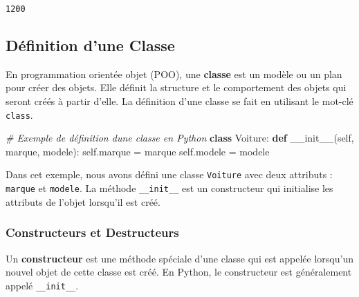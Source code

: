 \documentclass[11pt]{article}
\makeatletter
\newenvironment{Shaded}{}{}
\newcommand{\KeywordTok}[1]{\textcolor[rgb]{0.00,0.44,0.13}{\textbf{{#1}}}}
\newcommand{\CommentTok}[1]{\textcolor[rgb]{0.38,0.63,0.69}{\textit{{#1}}}}
\newcommand{\FunctionTok}[1]{\textcolor[rgb]{0.02,0.16,0.49}{{#1}}}
\newcommand{\NormalTok}[1]{{#1}}
\newcommand{\VariableTok}[1]{\textcolor[rgb]{0.10,0.09,0.49}{{#1}}}
\newcommand{\OperatorTok}[1]{\textcolor[rgb]{0.40,0.40,0.40}{{#1}}}
\newcommand{\boxspacing}{\kern\kvtcb@left@rule\kern\kvtcb@boxsep}
\newcommand{\prompt}[4]{
        {\ttfamily\llap{{\color{#2}[#3]:\hspace{3pt}#4}}\vspace{-\baselineskip}}
    }
\makeatother
\begin{document}
            \begin{tcolorbox}[breakable, size=fbox, boxrule=.5pt, pad at break*=1mm, opacityfill=0]
\prompt{Out}{outcolor}{8}{\boxspacing}
\begin{Verbatim}[commandchars=\\\{\}]
1200
\end{Verbatim}
\end{tcolorbox}
        
    \hypertarget{duxe9finition-dune-classe}{%
\subsection{Définition d'une Classe}\label{duxe9finition-dune-classe}}

En programmation orientée objet (POO), une \textbf{classe} est un modèle
ou un plan pour créer des objets. Elle définit la structure et le
comportement des objets qui seront créés à partir d'elle. La définition
d'une classe se fait en utilisant le mot-clé \texttt{class}.

\begin{Shaded}
\begin{Highlighting}[]
\CommentTok{\# Exemple de définition d\textquotesingle{}une classe en Python}
\KeywordTok{class}\NormalTok{ Voiture:}
    \KeywordTok{def} \FunctionTok{\_\_init\_\_}\NormalTok{(}\VariableTok{self}\NormalTok{, marque, modele):}
        \VariableTok{self}\NormalTok{.marque }\OperatorTok{=}\NormalTok{ marque}
        \VariableTok{self}\NormalTok{.modele }\OperatorTok{=}\NormalTok{ modele}
\end{Highlighting}
\end{Shaded}

Dans cet exemple, nous avons défini une classe \texttt{Voiture} avec
deux attributs : \texttt{marque} et \texttt{modele}. La méthode
\texttt{\_\_init\_\_} est un constructeur qui initialise les attributs
de l'objet lorsqu'il est créé.

\hypertarget{constructeurs-et-destructeurs}{%
\subsubsection{Constructeurs et
Destructeurs}\label{constructeurs-et-destructeurs}}

Un \textbf{constructeur} est une méthode spéciale d'une classe qui est
appelée lorsqu'un nouvel objet de cette classe est créé. En Python, le
constructeur est généralement appelé \texttt{\_\_init\_\_}.
\end{document}
